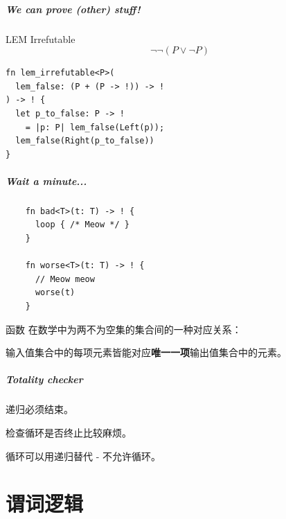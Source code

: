 \documentclass[UTF-8]{ctexbeamer}
\begin{document}
\begin{frame}[fragile]
  \frametitle{We can prove (other) stuff!}

  \begin{block}{LEM Irrefutable}
  $$
  \neg \neg (P \lor \neg P)
  $$
  \end{block}

  \pause
  \vspace{2em}

  \begin{verbatim}
fn lem_irrefutable<P>(
  lem_false: (P + (P -> !)) -> !
) -> ! {
  let p_to_false: P -> !
    = |p: P| lem_false(Left(p));
  lem_false(Right(p_to_false))
}
  \end{verbatim}
\end{frame}

\begin{frame}[fragile]
  \frametitle{Wait a minute...}

  \pause

  \begin{verbatim}
    fn bad<T>(t: T) -> ! {
      loop { /* Meow */ }
    }

    fn worse<T>(t: T) -> ! {
      // Meow meow
      worse(t)
    }
  \end{verbatim}

  \pause

  \vspace{1em}

  \begin{block}{函数}
    在数学中为两不为空集的集合间的一种对应关系：
    
    输入值集合中的每项元素皆能对应\textbf{唯一一项}输出值集合中的元素。
  \end{block}
\end{frame}

\begin{frame}
  \frametitle{Totality checker}

  递归必须结束。

  \pause

  \vspace{1em}

  检查循环是否终止比较麻烦。
  
  \pause
  
  循环可以用递归替代 - 不允许循环。
\end{frame}

\part{谓词逻辑}
\frame{\partpage}
\end{document}
